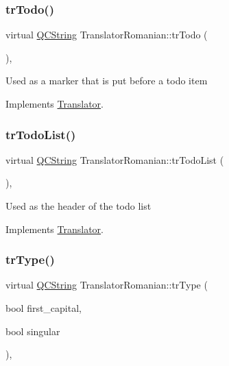 \subsubsection{\texorpdfstring{trTodo()}{trTodo()}}
{\footnotesize\ttfamily virtual \mbox{\hyperlink{class_q_c_string}{Q\+C\+String}} Translator\+Romanian\+::tr\+Todo (\begin{DoxyParamCaption}{ }\end{DoxyParamCaption})\hspace{0.3cm}{\ttfamily [inline]}, {\ttfamily [virtual]}}

Used as a marker that is put before a todo item 

Implements \mbox{\hyperlink{class_translator}{Translator}}.

\mbox{\label{class_translator_romanian_adffd324456787164c959ac58be5d71bf}} 
\subsubsection{\texorpdfstring{trTodoList()}{trTodoList()}}
{\footnotesize\ttfamily virtual \mbox{\hyperlink{class_q_c_string}{Q\+C\+String}} Translator\+Romanian\+::tr\+Todo\+List (\begin{DoxyParamCaption}{ }\end{DoxyParamCaption})\hspace{0.3cm}{\ttfamily [inline]}, {\ttfamily [virtual]}}

Used as the header of the todo list 

Implements \mbox{\hyperlink{class_translator}{Translator}}.

\mbox{\label{class_translator_romanian_a88f0ac05ff60616c5f1ee1c30a4e3730}} 
\subsubsection{\texorpdfstring{trType()}{trType()}}
{\footnotesize\ttfamily virtual \mbox{\hyperlink{class_q_c_string}{Q\+C\+String}} Translator\+Romanian\+::tr\+Type (\begin{DoxyParamCaption}\item[{bool}]{first\+\_\+capital,  }\item[{bool}]{singular }\end{DoxyParamCaption})\hspace{0.3cm}{\ttfamily [inline]}, {\ttfamily [virtual]}}

